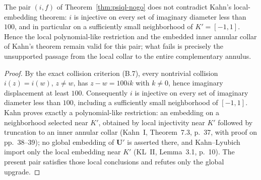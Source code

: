 \begin{proposition}\label{prop:local-compat}
The pair \((i,f)\) of Theorem~\ref{thm:psiql-nogo} does not contradict Kahn's local-embedding theorem: \(i\) is injective on every set of imaginary diameter less than \(100\), and in particular on a sufficiently small neighborhood of \(K'=[-1,1]\). Hence the local polynomial-like restriction and the embedded inner annular collar of Kahn's theorem remain valid for this pair; what fails is precisely the unsupported passage from the local collar to the entire complementary annulus.
\end{proposition}

\begin{proof}
By the exact collision criterion (B.7), every nontrivial collision \(i(z)=i(w)\), \(z\ne w\), has \(z-w=100ik\) with \(k\ne0\), hence imaginary displacement at least \(100\). Consequently \(i\) is injective on every set of imaginary diameter less than \(100\), including a sufficiently small neighborhood of \([-1,1]\). Kahn proves exactly a polynomial-like restriction: an embedding on a neighborhood selected near \(K'\), obtained by local injectivity near \(K'\) followed by truncation to an inner annular collar (Kahn~I, Theorem~7.3, p.~37, with proof on pp.~38--39); no global embedding of \(\mathbf U'\) is asserted there, and Kahn--Lyubich import only the local embedding near \(K'\) (KL~II, Lemma~3.1, p.~10). The present pair satisfies those local conclusions and refutes only the global upgrade.
\end{proof}